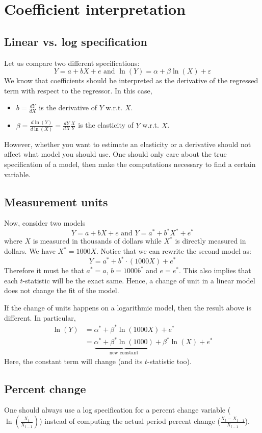 \section{Coefficient interpretation}

\subsection{Linear vs. log specification}

Let us compare two different specifications: $$Y = a + bX + e \text{ and } \ln(Y) = \alpha + \beta \ln(X) + \varepsilon $$
We know that coefficients should be interpreted as the derivative of the regressed term with respect to the regressor. In this case,\begin{itemize}
\item $b = \frac{dY}{dX}$ is the derivative of $Y$ w.r.t. $X$.
\item $\beta = \frac{d\ln(Y)}{d\ln(X)} = \frac{dY}{dX}\frac{X}{Y}$ is the elasticity of $Y$ w.r.t. $X$.
\end{itemize}
However, whether you want to estimate an elasticity or a derivative should not affect what model you should use. One should only care about the true specification of a model, then make the computations necessary to find a certain variable.

\subsection{Measurement units}
Now, consider two models $$Y = a + bX + e \text{ and } Y = a^* + b^*X^* + e^* $$ where $X$ is measured in thousands of dollars while $X^*$ is directly measured in dollars. We have $X^* = 1000 X$. Notice that we can rewrite the second model as: $$Y = a^* + b^*\cdot(1000 X) + e^* $$Therefore it must be that $a^* = a$, $b = 1000 b^*$ and $e = e^*$. This also implies that each $t$-statistic will be the exact same. Hence, a change of unit in a linear model does not change the fit of the model.

If the change of units happens on a logarithmic model, then the result above is different. In particular, \begin{align*}
\ln(Y) & = \alpha^* + \beta^*\ln(1000X) + e^* \\ 
& = \underbrace{\alpha^* + \beta^*\ln(1000)}_{\text{new constant}} + \beta^*\ln(X) + e^*
\end{align*} Here, the constant term will change (and its $t$-statistic too).

\subsection{Percent change}
One should always use a log specification for a percent change variable ($\ln(\frac{X_{t}}{X_{t-1}})$) instead of computing the actual period percent change ($\frac{X_t - X_{t-1}}{X_{t-1}}$).

